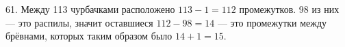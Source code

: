 61. Между 113 чурбачками расположено $113-1=112$ промежутков. 98 из них --- это распилы, значит оставшиеся $112-98=14$ --- это промежутки между брёвнами, которых таким образом было $14+1=15.$\\
